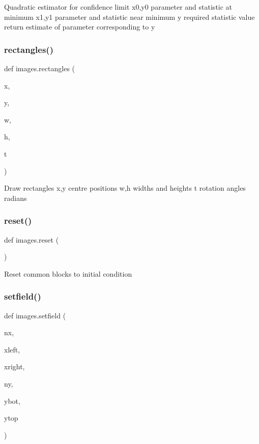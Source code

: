 \begin{DoxyVerb}Quadratic estimator for confidence limit
    x0,y0   parameter and statistic at minimum
    x1,y1   parameter and statistic near minimum
    y       required statistic value
return  estimate of parameter corresponding to y
\end{DoxyVerb}
 \mbox{\label{namespaceimages_aef48128ba9b2f8644c43c09f80f20fa0}} 
\subsubsection{\texorpdfstring{rectangles()}{rectangles()}}
{\footnotesize\ttfamily def images.\+rectangles (\begin{DoxyParamCaption}\item[{}]{x,  }\item[{}]{y,  }\item[{}]{w,  }\item[{}]{h,  }\item[{}]{t }\end{DoxyParamCaption})}

\begin{DoxyVerb}Draw rectangles
    x,y   centre positions
    w,h   widths and heights
    t     rotation angles radians
\end{DoxyVerb}
 \mbox{\label{namespaceimages_a4f1351dead951fa6728f4f26e6471859}} 
\subsubsection{\texorpdfstring{reset()}{reset()}}
{\footnotesize\ttfamily def images.\+reset (\begin{DoxyParamCaption}{ }\end{DoxyParamCaption})}

\begin{DoxyVerb}Reset common blocks to initial condition\end{DoxyVerb}
 \mbox{\label{namespaceimages_a3b0ccac946edc83732a3f3d384923ecd}} 
\subsubsection{\texorpdfstring{setfield()}{setfield()}}
{\footnotesize\ttfamily def images.\+setfield (\begin{DoxyParamCaption}\item[{}]{nx,  }\item[{}]{xleft,  }\item[{}]{xright,  }\item[{}]{ny,  }\item[{}]{ybot,  }\item[{}]{ytop }\end{DoxyParamCaption})}

